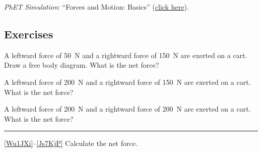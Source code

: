 \documentclass{article}
\begin{document}
\textit{PhET Simulation}: ``Forces and Motion: Basics'' (\href{https://phet.colorado.edu/en/simulations/forces-and-motion-basics}{click here}).



\subsection{Exercises}



\begin{exercise} \label{RApeJt}
A leftward force of \SI{50}{N} and a rightward force of \SI{150}{N} are exerted on a cart. Draw a free body diagram. What is the net force?
\end{exercise}

\begin{exercise} \label{MUJe54}
A leftward force of \SI{200}{N} and a rightward force of \SI{150}{N} are exerted on a cart. What is the net force? 
\end{exercise}

\begin{exercise} \label{Uhrg0I}
A leftward force of \SI{200}{N} and a rightward force of \SI{200}{N} are exerted on a cart. What is the net force? 
\end{exercise}

\hrule
\vspace{2ex}


\ref{Wu1JXi}--\ref{Js7KjP} Calculate the net force.

\begin{exercise} \label{Wu1JXi}
\phantom{.}
\vspace{-2em}
\end{exercise}

\begin{center}
\end{center}
\end{document}
